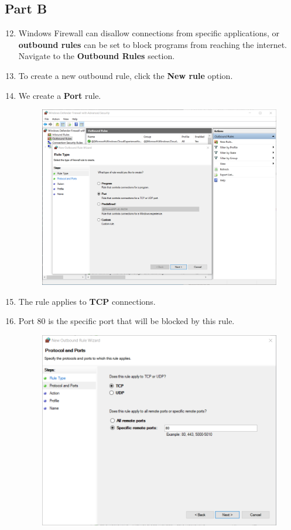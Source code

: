 \subsection*{Part B}
\begin{enumerate}
    \setcounter{enumi}{11}
    \item Windows Firewall can disallow connections from specific applications, or \textbf{outbound rules} can be set to block programs from reaching the internet. Navigate to the \textbf{Outbound Rules} section.
    \item To create a new outbound rule, click the \textbf{New rule} option.
    \item We create a \textbf{Port} rule.
    \begin{figure}[H]
        \includegraphics[width=\linewidth]{figures/pic9.png}
    \end{figure}
    \item The rule applies to \textbf{TCP} connections.
    \item Port 80 is the specific port that will be blocked by this rule.
    \begin{figure}[H]
        \includegraphics[width=\linewidth]{figures/pic10.png}

\end{figure}
\end{enumerate}

